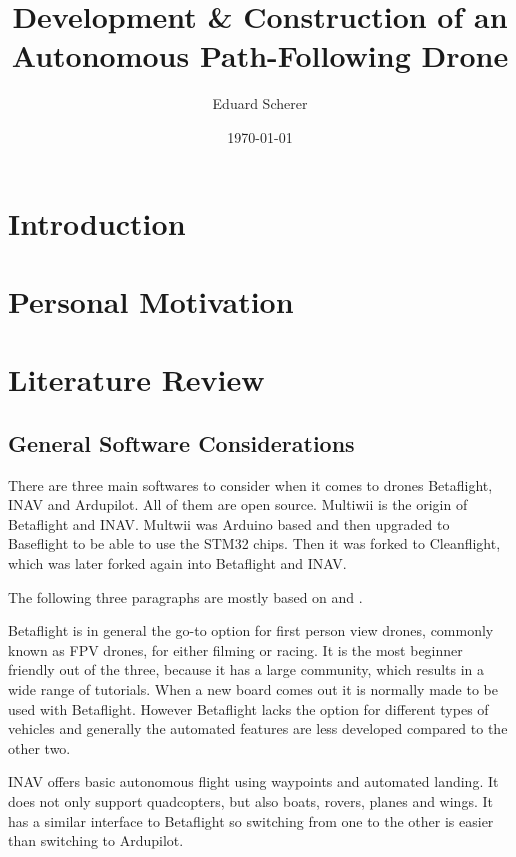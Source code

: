 \documentclass{article}
\author{Eduard Scherer}
\title{Development \& Construction of an Autonomous Path-Following Drone}
\date{\today}
\begin{document}
\maketitle
\tableofcontents
\pagebreak

	\section{Introduction}

	\section{Personal Motivation}
	\section{Literature Review}
	\subsection{General Software Considerations}
	
	There are three main softwares to consider when it comes to drones Betaflight, INAV and Ardupilot. All of them are open source. Multiwii is the origin of Betaflight and INAV. Multwii was Arduino based and then upgraded to Baseflight to be able to use the STM32 chips. Then it was forked to Cleanflight, which was later forked again into Betaflight and INAV\cite{history}. 
	
	The following three paragraphs are mostly based on \cite{firmwarearticle} and \cite{firmwarevideo}.
	
	Betaflight is in general the go-to option for first person view drones, commonly known as FPV drones, for either filming or racing. It is the most beginner friendly out of the three, because it has a large community, which results in a wide range of tutorials. When a new board comes out it is normally made to be used with Betaflight. However Betaflight lacks the option for different types of vehicles and generally the automated features are less developed compared to the other two. 
	
	INAV offers basic autonomous flight using waypoints and automated landing. It does not only support quadcopters, but also boats, rovers, planes and wings. It has a similar interface to Betaflight so switching from one to the other is easier than switching to Ardupilot.
	
\end{document}
